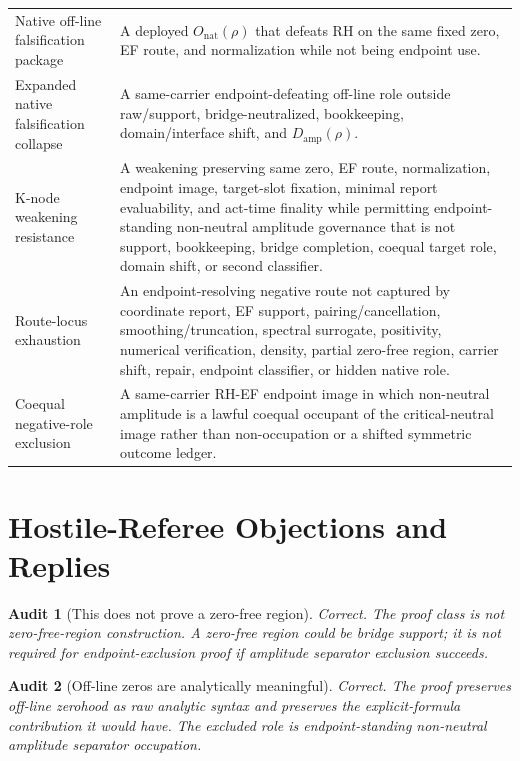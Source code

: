 \documentclass[11pt]{article}
\newtheorem{audit}{Audit}[section]
\newcommand{\Damp}{D_{\mathrm{amp}}}
\newcommand{\Onat}{O_{\mathrm{nat}}}
\begin{document}
\begin{longtable}{L{0.29\textwidth}L{0.64\textwidth}}
Native off-line falsification package & A deployed \(\Onat(\rho)\) that defeats RH on the same fixed zero, EF route, and normalization while not being endpoint use.\\
Expanded native falsification collapse & A same-carrier endpoint-defeating off-line role outside raw/support, bridge-neutralized, bookkeeping, domain/interface shift, and \(\Damp(\rho)\).\\
K-node weakening resistance & A weakening preserving same zero, EF route, normalization, endpoint image, target-slot fixation, minimal report evaluability, and act-time finality while permitting endpoint-standing non-neutral amplitude governance that is not support, bookkeeping, bridge completion, coequal target role, domain shift, or second classifier.\\
Route-locus exhaustion & An endpoint-resolving negative route not captured by coordinate report, EF support, pairing/cancellation, smoothing/truncation, spectral surrogate, positivity, numerical verification, density, partial zero-free region, carrier shift, repair, endpoint classifier, or hidden native role.\\
Coequal negative-role exclusion & A same-carrier RH-EF endpoint image in which non-neutral amplitude is a lawful coequal occupant of the critical-neutral image rather than non-occupation or a shifted symmetric outcome ledger.\\
\bottomrule
\end{longtable}

\section{Hostile-Referee Objections and Replies}

\begin{audit}[This does not prove a zero-free region]
Correct.  The proof class is not zero-free-region construction.  A zero-free region could be bridge support; it is not required for endpoint-exclusion proof if amplitude separator exclusion succeeds.
\end{audit}

\begin{audit}[Off-line zeros are analytically meaningful]
Correct.  The proof preserves off-line zerohood as raw analytic syntax and preserves the explicit-formula contribution it would have.  The excluded role is endpoint-standing non-neutral amplitude separator occupation.
\end{audit}
\end{document}
